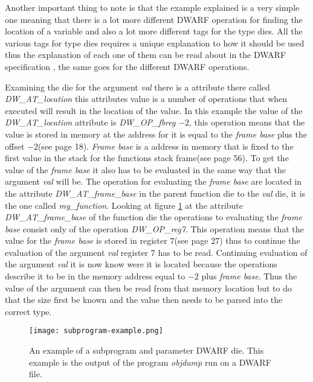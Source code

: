 Another important thing to note is that the example explained is a very simple one meaning that there is a lot more different \gls{DWARF} operation for finding the location of a variable and also a lot more different tags for the type \glspl{die}.
All the various tags for type \glspl{die} requires a unique explanation to how it should be used thus the explanation of each one of them can be read about in the \gls{DWARF} specification \cite{dwarf}, the same goes for the different \gls{DWARF} operations.


Examining the \gls{die} for the argument \emph{val} there is a attribute there called \emph{DW\_AT\_location} this attributes value is a number of operations that when executed will result in the location of the value.
In this example the value of the \emph{DW\_AT\_location} attribute is \emph{DW\_OP\_fbreg} $-2$, this operation means that the value is stored in memory at the address for it is equal to the \emph{frame base} plus the offset $-2$(see \cite{dwarf} page 18).
\emph{Frame base} is a address in memory that is fixed to the first value in the stack for the functions stack frame(see \cite{dwarf} page 56).
To get the value of the \emph{frame base} it also has to be evaluated in the same way that the argument \emph{val} will be.
The operation for evaluating the \emph{frame base} are located in the attribute \emph{DW\_AT\_frame\_base} in the parent function \gls{die} to the \emph{val} die, it is the one called \emph{my\_function}.
Looking at figure \ref{fig:subprogramexample} at the attribute \emph{DW\_AT\_frame\_base} of the function \gls{die} the operations to evaluating the \emph{frame base} consist only of the operation \emph{DW\_OP\_reg7}.
This operation means that the value for the \emph{frame base} is stored in register $7$(see \cite{dwarf} page 27) thus to continue the evaluation of the argument \emph{val} register $7$ has to be read.
Continuing evaluation of the argument \emph{val} it is now know were it is located because the operations describe it to be in the memory address equal to $-2$ plus \emph{frame base}.
Thus the value of the argument can then be read from that memory location but to do that the size first be known and the value then needs to be parsed into the correct type.


\begin{figure}[h]
	\centering
	\texttt{[image: subprogram-example.png]}
	\caption{An example of a subprogram and parameter \gls{DWARF} \gls{die}. This example is the output of the program \emph{objdump} run on a \gls{DWARF} file.}
	\label{fig:subprogramexample}
\end{figure}


